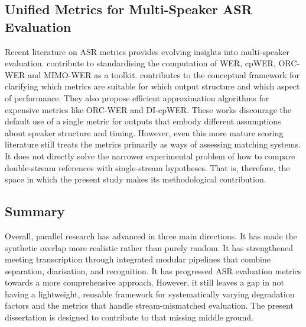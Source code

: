 \subsection{Unified Metrics for Multi-Speaker ASR Evaluation}
Recent literature on ASR metrics provides evolving insights into multi-speaker evaluation. \citet{vonneumann2024meetevaltoolkitcomputationword} contribute to standardising the computation of WER, cpWER, ORC-WER and MIMO-WER as a toolkit. \citet{von_Neumann_2025} contributes to the conceptual framework for clarifying which metrics are suitable for which output structure and which aspect of performance. They also propose efficient approximation algorithms for expensive metrics like ORC-WER and DI-cpWER. These works discourage the default use of a single metric for outputs that embody different assumptions about speaker structure and timing. However, even this more mature scoring literature still treats the metrics primarily as ways of assessing matching systems. It does not directly solve the narrower experimental problem of how to compare double-stream references with single-stream hypotheses. That is, therefore, the space in which the present study makes its methodological contribution.

\subsection{Summary}
Overall, parallel research has advanced in three main directions. It has made the synthetic overlap more realistic rather than purely random. It has strengthened meeting transcription through integrated modular pipelines that combine separation, diarisation, and recognition. It has progressed ASR evaluation metrics towards a more comprehensive approach. However, it still leaves a gap in not having a lightweight, reusable framework for systematically varying degradation factors and the metrics that handle stream-mismatched evaluation. The present dissertation is designed to contribute to that missing middle ground.